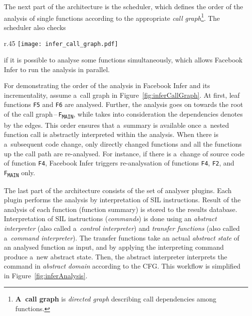 The next part of the architecture is the scheduler, which defines the
order of the analysis of single functions according to the appropriate
\emph{call graph}\footnote{\textbf{A~call graph} is \emph{directed graph}
describing call dependencies among functions.}. The scheduler also checks
\begin{wrapfigure}{r}{.45 \linewidth}
    \centering
    \vspace{-.5em}
    \texttt{[image: infer\_call\_graph.pdf]}
    \caption{
        A~call graph for an illustration of Facebook Infer's
        analysis process~\cite{inferAISlides}, \cite{excel2019FBInfer},
        \cite{projectPracticeMarcin2018}
    }
    \label{fig:inferCallGraph}
\end{wrapfigure}
if it is possible to analyse some functions simultaneously, which allows
Facebook Infer to run the analysis in parallel.

\begin{example}
    For demonstrating the order of the analysis in Facebook Infer and its
    incrementality, assume a~call graph in Figure~\ref{fig:inferCallGraph}.
    At first, leaf functions \texttt{F5} and \texttt{F6} are analysed. Further,
    the analysis goes on towards the root of the call
    graph\,--\,\texttt{F\textsubscript{MAIN}}, while takes into consideration
    the dependencies denotes by the edges. This order ensures that a~summary
    is available once a~nested function call is abstractly interpreted within
    the analysis. When there is a~subsequent code change, only directly changed
    functions and all the functions up the call path are re-analysed. For
    instance, if there is a~change of source code of function \texttt{F4},
    Facebook Infer triggers re-analysation of functions \texttt{F4},
    \texttt{F2}, and \texttt{F\textsubscript{MAIN}} only.
\end{example}

The last part of the architecture consists of the set of analyser plugins.
Each plugin performs the analysis by interpretation of SIL instructions.
Result of the analysis of each function (function summary) is stored to
the results database. Interpretation of SIL instructions (\emph{commands})
is done using an \emph{abstract interpreter} (also called a~\emph{control
interpreter}) and \emph{transfer functions} (also called a~\emph{command
interpreter}). The transfer functions take an actual \emph{abstract state}
of an analysed function as input, and by applying the interpreting command
produce a~new abstract state. Then, the abstract interpreter interprets the
command in \emph{abstract domain} according to the CFG. This workflow is
simplified in Figure~\ref{fig:inferAnalysis}.


